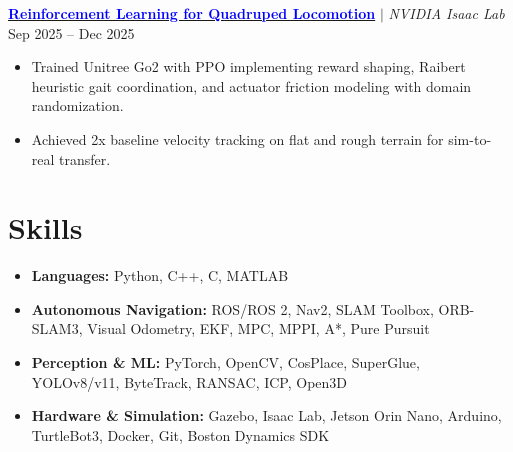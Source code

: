 \documentclass[10pt,letterpaper]{article}
\begin{document}
\href{https://github.com/Nishant-ZFYII/rob6323_go2_project}{\textcolor{blue}{\textbf{Reinforcement Learning for Quadruped Locomotion}}} $|$ \textit{NVIDIA Isaac Lab} \hfill Sep 2025 -- Dec 2025
\begin{itemize}
    \item Trained Unitree Go2 with PPO implementing reward shaping, Raibert heuristic gait coordination, and actuator friction modeling with domain randomization.
    \item Achieved 2x baseline velocity tracking on flat and rough terrain for sim-to-real transfer.
\end{itemize}

\section{Skills}

\begin{itemize}[leftmargin=0in, label={}, itemsep=0pt]
    \item \textbf{Languages:} Python, C++, C, MATLAB
    \item \textbf{Autonomous Navigation:} ROS/ROS 2, Nav2, SLAM Toolbox, ORB-SLAM3, Visual Odometry, EKF, MPC, MPPI, A*, Pure Pursuit
    \item \textbf{Perception \& ML:} PyTorch, OpenCV, CosPlace, SuperGlue, YOLOv8/v11, ByteTrack, RANSAC, ICP, Open3D
    \item \textbf{Hardware \& Simulation:} Gazebo, Isaac Lab, Jetson Orin Nano, Arduino, TurtleBot3, Docker, Git, Boston Dynamics SDK
\end{itemize}
\end{document}
